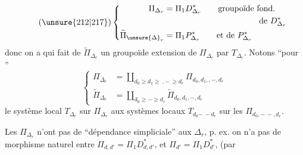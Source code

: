 \[
\tag{\unsure{212|217}}
\left\{\begin{aligned}
\Pi_{\Delta_r}&=\Pi_1D^*_{\Delta_r}\qquad\text{groupoïde fond.}\\
&\hspace{4cm}\text{de }D^*_{\Delta_r}\\
\widetilde\Pi_{\unsure{\Delta}_r}&=\Pi_1P^*_{\Delta_r}\qquad\text{et de }P^*_{\Delta_r}
\end{aligned}\right.
\]
donc on a
qui fait de $\widetilde\Pi_{\Delta_r}$ un groupoïde
extension de $\Pi_{\Delta_r}$ par $T_{\Delta_r}$.
Notons ``pour ''
\[
\tag{214}
\left\{\begin{aligned}
\Pi_{\Delta_r}&=\coprod_{d_0\geq d_1\geq\mathord{\text{.}\,-}\geq d_r}\Pi_{d_0,d_1,,-,d_r}\\
\widetilde\Pi_{\Delta_r}&=\coprod_{d_0\geq-\geq d_r}\widetilde\Pi_{d_0,d_1,-,d_r}
\end{aligned}\right.
\]
le système local $T_{\Delta_r}$ sur $\Pi_{\Delta_r}$ 
 aux systèmes locaux
$T_{d_0\mathord{-\, -}d_r}$ sur les $\Pi_{d_0,\mathord{-\, -},d_r}$.

Les $\Pi_{\Delta_r}$ n'ont pas de ``dépendance
simpliciale''  aux $\Delta_r$, p. ex. on n'a
pas de morphisme naturel entre
$\Pi_{d,d'}=\Pi_1D^*_{d,d'}$, et $\Pi_{d'}=\Pi_1D^*_{d'}$, (par

